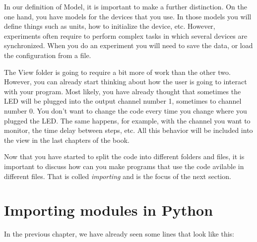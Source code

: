 
In our definition of Model, it is important to make a further distinction. On the one hand, you have models for the devices that you use. In those models you will define things such as units, how to initialize the device, etc. However, experiments often require to perform complex tasks in which several devices are synchronized. When you do an experiment you will need to save the data, or load the configuration from a file. 


The View folder is going to require a bit more of work than the other two. However, you can already start thinking about how the user is going
to interact with your program. Most likely, you have already thought that sometimes the {LED} will be plugged into the output channel number 1,
sometimes to channel number 0. You don't want to change the code every time you change where you plugged the LED. The same happens, for example, with the channel you want to monitor, the time delay between steps, etc. All this behavior will be included into the view in the last chapters of the book. 

Now that you have started to split the code into different folders and files, it is important to discuss how can you make programs that use the code avilable in different files. That is colled \emph{importing} and is the focus of the next section. 

\section{Importing modules in Python}
In the previous chapter, we have already seen some lines that look like this:

